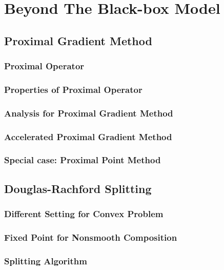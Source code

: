 \newpage
\section{Beyond The Black-box Model}

\subsection{Proximal Gradient Method}

\subsubsection{Proximal Operator}

\subsubsection{Properties of Proximal Operator}

\subsubsection{Analysis for Proximal Gradient Method}

\subsubsection{Accelerated Proximal Gradient Method}

\subsubsection{Special case: Proximal Point Method}

\subsection{Douglas-Rachford Splitting}

\subsubsection{Different Setting for Convex Problem}

\subsubsection{Fixed Point for Nonsmooth Composition}

\subsubsection{Splitting Algorithm}


